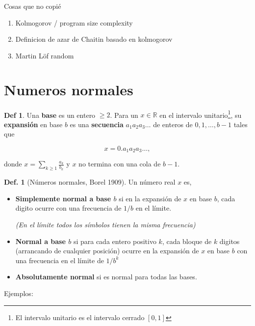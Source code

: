 \documentclass{report}
\theoremstyle{definition} %
\newtheorem{definition}{Def.}
\newtheorem*{definition*}{Def}
\begin{document}
Cosas que no copié

\begin{enumerate}
    \item Kolmogorov / program size complexity
    \item Definicion de azar de Chaitin basado en kolmogorov
    \item Martin Löf random
\end{enumerate}

\section{Numeros normales}

\begin{definition*}
    Una \textbf{base} es un entero $\geq 2$. Para un $x \in \mathbb{R}$ en el
    intervalo unitario\footnote{El intervalo unitario es el intervalo cerrado
    $[0, 1]$}, su \textbf{expansión} en base $b$ es una \textbf{secuencia} $a_1
    a_2 a_3 \dots$ de enteros de ${0, 1, \dots, b-1}$ tales que

    $$x = 0.a_1 a_2 a_3 \dots,$$

    donde $x = \sum_{k \geq 1} \frac{a_k}{b_k}$ y $x$ no termina con una cola de
    $b - 1$.
\end{definition*}


\begin{definition}[Números normales, Borel 1909]
    Un número real $x$ es,
    \begin{itemize}
        \item \textbf{Simplemente normal a base $b$} si en la expansión de $x$
        en base $b$, cada digito ocurre con una frecuencia de $1/b$ en el
        límite.

        \textit{(En el límite todos los símbolos tienen la misma frecuencia)}
        \item \textbf{Normal a base $b$} si para cada entero positivo $k$, cada
        bloque de $k$ digitos (arrancando de cualquier posición) ocurre en la
        expansión de $x$ en base $b$ con una frecuencia en el límite de $1/b^k$
        \item \textbf{Absolutamente normal} si es normal para todas las bases.
    \end{itemize}
\end{definition}

Ejemplos:
\end{document}
